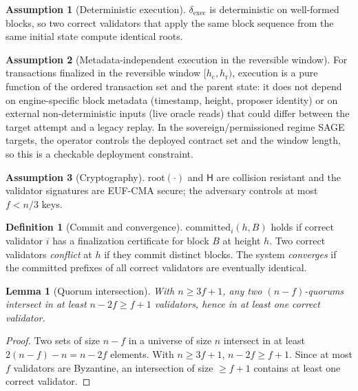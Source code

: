 \documentclass[journal]{IEEEtran}
\newtheorem{lemma}{Lemma}
\theoremstyle{definition}
\newtheorem{definition}{Definition}
\newtheorem{assumption}{Assumption}
\theoremstyle{remark}
\begin{document}
\begin{assumption}[Deterministic execution]
\label{as:exec}
$\delta_{\mathrm{exec}}$ is deterministic on well-formed blocks, so two correct validators
that apply the same block sequence from the same initial state compute identical roots.
\end{assumption}

\begin{assumption}[Metadata-independent execution in the reversible window]
\label{as:metadata}
For transactions finalized in the reversible window $[h_{\mathrm{c}}, h_{\mathrm{r}})$, execution
is a pure function of the ordered transaction set and the parent state: it does not depend on
engine-specific block metadata (timestamp, height, proposer identity) or on external
non-deterministic inputs (live oracle reads) that could differ between the target attempt and a
legacy replay. In the sovereign/permissioned regime SAGE targets, the operator controls the
deployed contract set and the window length, so this is a checkable deployment constraint.
\end{assumption}

\begin{assumption}[Cryptography]
\label{as:crypto}
$\mathrm{root}(\cdot)$ and $\mathsf{H}$ are collision resistant and the validator signatures are
EUF-CMA secure; the adversary controls at most $f<n/3$ keys.
\end{assumption}

\begin{definition}[Commit and convergence]
\label{def:commit}
$\mathrm{committed}_i(h,B)$ holds if correct validator $i$ has a finalization certificate for
block $B$ at height $h$. Two correct validators \emph{conflict} at $h$ if they commit distinct
blocks. The system \emph{converges} if the committed prefixes of all correct validators are
eventually identical.
\end{definition}

\begin{lemma}[Quorum intersection]
\label{lem:qi}
With $n\ge 3f+1$, any two $(n-f)$-quorums intersect in at least $n-2f\ge f+1$ validators, hence
in at least one correct validator.
\end{lemma}
\begin{proof}
Two sets of size $n-f$ in a universe of size $n$ intersect in at least $2(n-f)-n = n-2f$
elements. With $n\ge 3f+1$, $n-2f\ge f+1$. Since at most $f$ validators are Byzantine, an
intersection of size $\ge f+1$ contains at least one correct validator.
\end{proof}
\end{document}
